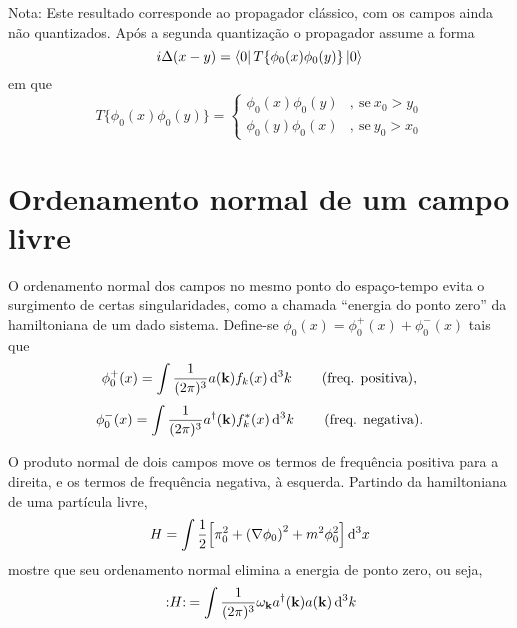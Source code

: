 \documentclass[a4paper, 11pt, oneside]{impression}
\begin{document}
\begin{exercise}{}
\begin{enumerate}[(a)]
       {\small \noindent Nota: Este resultado corresponde ao propagador clássico, com os campos ainda não quantizados. Após a segunda quantização o propagador assume a forma
            \begin{equation*}
                i\Delta(x-y) = \bra{0}T\{\phi_{0}(x)\phi_{0}(y)\}\ket{0}
            \end{equation*}
        em que
            \begin{equation*}
                T\{\phi_{0}(x)\phi_{0}(y)\} = \begin{cases}
                    \phi_{0}(x)\phi_{0}(y) &,~ \text{se}~x_{0}>y_{0} \\
                    \phi_{0}(y)\phi_{0}(x) &,~ \text{se}~y_{0}>x_{0}
                \end{cases}
            \end{equation*}}
    \end{enumerate}
\end{exercise}



\newpage

\chapter{Ordenamento normal de um campo livre}\label{quest: four}

\begin{exercise}{}
    O ordenamento normal dos campos no mesmo ponto do espaço-tempo evita o surgimento de certas singularidades, como a chamada ``energia do ponto zero'' da hamiltoniana de um dado sistema. Define-se $\phi_{0}(x) = \phi_{0}^{+}(x) + \phi_{0}^{-}(x)$ tais que
        \begin{equation*}
            \phi_{0}^{+}(x) = \int \dfrac{1}{(2\pi)^3} a(\vb{k}) f_{k}(x) \dd[3]{k} \qquad \text{(freq. positiva)},
        \end{equation*}
        \begin{equation*}
            \phi_{0}^{-}(x) = \int \dfrac{1}{(2\pi)^3} a^{\dagger}(\vb{k}) f_{k}^{\ast}(x) \dd[3]{k} \qquad \text{(freq. negativa)}.
        \end{equation*}

    \noindent O produto normal de dois campos move os termos de frequência positiva para a direita, e os termos de frequência negativa, à esquerda. Partindo da hamiltoniana de uma partícula livre,
        \begin{equation*}
            H = \int \dfrac{1}{2}\qty[\pi_{0}^2 + \qty(\nabla\phi_{0})^2 + m^2\phi_{0}^2] \dd[3]{x}
        \end{equation*}
    mostre que seu ordenamento normal elimina a energia de ponto zero, ou seja,
        \begin{equation*}
            \mkern4mu:\mathrel{H}:\mkern4mu = \int \dfrac{1}{(2\pi)^3}\omega_{\vb{k}} a^{\dagger}(\vb{k})a(\vb{k}) \dd[3]{k}
        \end{equation*}
\end{exercise}
\end{document}
